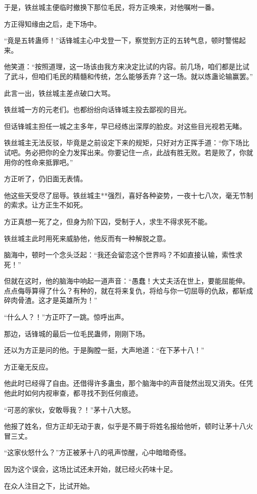 \begin{this_body}
于是，铁丝城主便临时撤换下那位毛民，将方正唤来，对他嘱咐一番。

方正得知缘由之后，走下场中。

“竟是五转蛊师！”话锋城主心中戈登一下，察觉到方正的五转气息，顿时警惕起来。

他笑道：“按照道理，这一场该由我方来决定比试的内容。前几场，咱们都是比试了武斗，但咱们毛民的精髓和传统，怎么能够丢弃？这一场。就以炼蛊论输赢罢。”

此言一出，铁丝城主差点破口大骂。

铁丝城一方的元老们。也都纷纷向话锋城主投去鄙视的目光。

但话锋城主担任一城之主多年，早已经练出深厚的脸皮。对这些目光视若无睹。

铁丝城主无法反驳，毕竟是之前设定下来的规矩，只好对方正挥手道：“你下场比试吧。务必把你的全力发挥出来。你要记住一点，此战有胜无败。若是败了，你就用你的性命来抵罪吧。”

方正听了，仍旧面无表情。

他这些天受尽了屈辱。铁丝城主**强烈，喜好各种姿势，一夜十七八次，毫无节制的索求。让方正生不如死。

方正真想一死了之，但身为阶下囚，受制于人，求生不得求死不能。

铁丝城主此时用死来威胁他，他反而有一种解脱之意。

脑海中，顿时一个念头泛起：“我还会留恋这个世界吗？不如直接认输，索性求死！”

但就在这时，他的脑海中响起一道声音：“愚蠢！大丈夫活在世上，要能屈能伸。点点侮辱算得了什么？有种的，就在将来复仇，将给与你一切屈辱的仇敌，都斩成碎肉骨渣。这才是英雄所为！”

“什么人？！”方正吓了一跳。惊呼出声。

那边，话锋城的最后一位毛民蛊师，刚刚下场。

还以为方正是问的他。于是胸膛一挺，大声地道：“在下茅十八！”

方正毫无反应。

他此时已经得了自由。还借得许多蛊虫，那个脑海中的声音陡然出现又消失。任凭他此时如何内视审查，都寻找不到任何痕迹。

“可恶的家伙，安敢辱我？！”茅十八大怒。

他报了姓名，但方正却无动于衷，似乎是不屑于将姓名报给他听，顿时让茅十八火冒三丈。

“这家伙怒什么？”方正被茅十八的吼声惊醒，心中暗暗奇怪。

因为这个误会，这场比试还未开始，就已经火药味十足。

在众人注目之下，比试开始。


\end{this_body}
